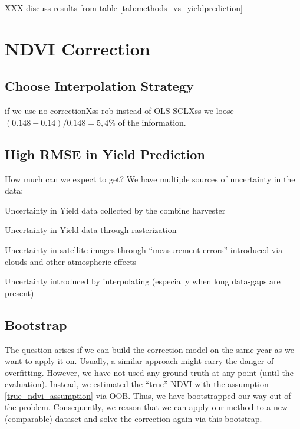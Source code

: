 XXX discuss results from table \ref{tab:methods_vs_yieldprediction}

\section{NDVI Correction}{\label{sec:discussion_corr}
    \subsection{Choose Interpolation Strategy}\label{sec:discussion_iplfstrategy-choose}
        if we use no-correctionXss-rob instead of OLS-SCLXss we loose $(0.148-0.14)/0.148 = 5,4\%$ of the information.
    \subsection{High RMSE in Yield Prediction}{\label{sec:discuss_high-rmse-in-yield-prdiction}
        How much can we expect to get? We have multiple sources of uncertainty in the data:
        \begin{Nenumerate}
            \item Uncertainty in Yield data collected by the combine harvester
            \item Uncertainty in Yield data through rasterization
            \item Uncertainty in satellite images through ``measurement errors'' introduced via clouds and other atmospheric effects 
            \item Uncertainty introduced by interpolating (especially when long data-gaps are present)
        \end{Nenumerate}
    }

    \subsection{Bootstrap}
        The question arises if we can build the correction model on the same year as we want to apply it on. Usually, a similar approach might carry the danger of overfitting. However, we have not used any ground truth at any point (until the evaluation). Instead, we estimated the ``true'' NDVI with the assumption \ref{true_ndvi_assumption} via OOB. Thus, we have bootstrapped our way out of the problem. Consequently, we reason that we can apply our method to a new (comparable) dataset and solve the correction again via this bootstrap.
}
